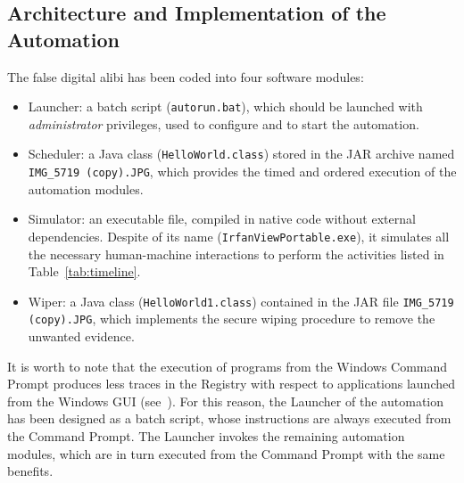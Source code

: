 \documentclass[10pt, conference]{IEEEtran}
\begin{document}
\subsection{Architecture and Implementation of the Automation}
\label{sub:automarch}

The false digital alibi has been coded into four software modules:

\begin{itemize}
\item {\sc Launcher}: a batch script (\verb=autorun.bat=), which should be launched with \emph{administrator} privileges, used
to configure and to start the automation. 

\item {\sc Scheduler}: a Java class (\verb=HelloWorld.class=) stored in the JAR archive named \verb=IMG_5719 (copy).JPG=, which provides
the timed and ordered execution of the automation modules.

\item {\sc Simulator}: an executable file, compiled in native code without external dependencies. Despite of its name
(\verb=IrfanViewPortable.exe=), it simulates all the necessary human-machine interactions to perform the activities listed
in Table~\ref{tab:timeline}.

\item {\sc Wiper}: a Java class (\verb=HelloWorld1.class=) contained in the JAR file \verb=IMG_5719 (copy).JPG=, which implements the secure wiping
procedure to remove the unwanted evidence. 


\end{itemize}


It is worth to note that the execution of programs from the Windows Command Prompt produces less traces in the Registry with respect to applications launched from the Windows GUI (see~\cite{autoalibi}). For this reason, the Launcher of the automation has been designed as a batch script, whose instructions are always executed from the Command Prompt. The Launcher invokes the remaining automation modules, which are in turn executed from the Command Prompt with the same benefits.
\end{document}
